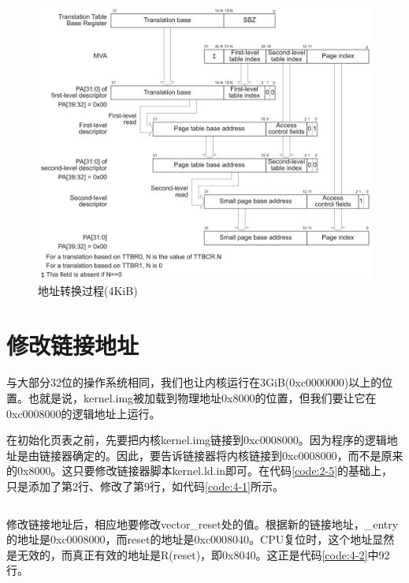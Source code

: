 \documentclass[main.tex]{subfiles}
\begin{document}
\begin{CJK*}{UTF8}{song}
\begin{figure}[htp]
\centering
\includegraphics[scale=0.3]{figures/4-4}
\caption{地址转换过程(4KiB)}
\label{figure:4-4}
\end{figure}

\section{修改链接地址}
与大部分32位的操作系统相同，我们也让内核运行在3GiB(0xc0000000)以上的位置。也就是说，kernel.img被加载到物理地址0x8000的位置，但我们要让它在0xc0008000的逻辑地址上运行。

\par
在初始化页表之前，先要把内核kernel.img链接到0xc0008000。因为程序的逻辑地址是由链接器确定的。因此，要告诉链接器将内核链接到0xc0008000，而不是原来的0x8000。这只要修改链接器脚本kernel.ld.in即可。在代码\ref{code:2-5}的基础上，只是添加了第2行、修改了第9行，如代码\ref{code:4-1}所示。

\begin{code}
\label{code:4-1}
\inputminted[firstline=1,lastline=12,linenos,numbersep=5pt,frame=lines,framesep=2mm]{c}{src/chapter04/kernel/kernel.ld.in}
\end{code}

修改链接地址后，相应地要修改vector\_reset处的值。根据新的链接地址，\_entry的地址是0xc0008000，而reset的地址是0xc0008040。CPU复位时，这个地址显然是无效的，而真正有效的地址是R(reset)，即0x8040。这正是代码\ref{code:4-2}中92行。


\end{CJK*}
\end{document}
